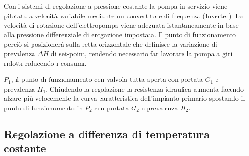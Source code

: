 \documentclass[laurea,oneside,11pt]{USiena_tesiLM}
\begin{document}
Con i sistemi di regolazione  a pressione costante la pompa in servizio viene pilotata a velocità variabile mediante un convertitore di frequenza (Inverter). La velocità di rotazione dell'elettropompa viene adeguata istantaneamente in base alla pressione differenziale di erogazione impostata. Il punto di funzionamento perciò si posizionerà sulla retta orizzontale che definisce la variazione di prevalenza $\Delta H$ di set-point, rendendo necessario far lavorare la pompa a giri ridotti riducendo i consumi.

$P_1$, il punto di funzionamento con valvola tutta aperta con portata $G_1$ e prevalenza $H_1$. Chiudendo la regolazione la resistenza idraulica aumenta facendo alzare più velocemente la curva caratteristica dell'impianto primario spostando il punto di funzionamento in $P_2$ con portata  $G_2$ e prevalenza $H_2$. 


\subsection{Regolazione a differenza di temperatura costante}
\end{document}
